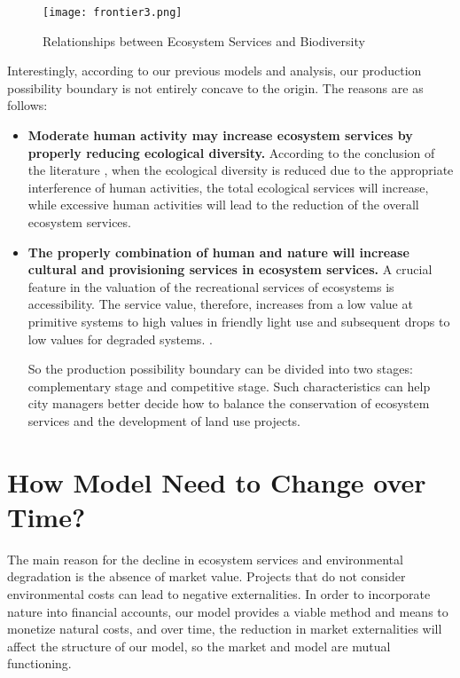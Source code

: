 \documentclass{mcmthesis}
\begin{document}
			\begin{figure}[h]
				\small
				\centering
				\texttt{[image: frontier3.png]}
				\caption{Relationships between Ecosystem Services and Biodiversity}
				\label{fig:multiplier}
			\end{figure}
			
			Interestingly, according to our previous models and analysis, our production possibility boundary is not entirely concave to the origin. The reasons are as follows:
			
			\begin{itemize}
				
				\item \textbf{Moderate human activity may increase ecosystem services by properly reducing  ecological diversity.} According to the conclusion of the literature \cite{de2010challenges}, when the ecological diversity is reduced due to the appropriate interference of human activities, the total ecological services will increase, while excessive human activities will lead to the reduction of the overall ecosystem services.
				
				\item \textbf{The properly combination of human and nature will increase cultural and provisioning services in ecosystem services.} A crucial feature in the valuation of the recreational services of ecosystems is accessibility. The service value, therefore, increases from a low value at primitive systems to high values in friendly light use and subsequent drops to low values for degraded systems. \cite{braat2008cost}.
				
				So the production possibility boundary can be divided into two stages: complementary stage and competitive stage. Such characteristics can help city managers better decide how to balance the conservation of ecosystem services and the development of land use projects.
				
			\end{itemize}
		
	\section{How Model Need to Change over Time?}	
	
		The main reason for the decline in ecosystem services and environmental degradation is the absence of market value. Projects that do not consider environmental costs can lead to negative externalities. In order to incorporate nature into financial accounts, our model provides a viable method and means to monetize natural costs, and over time, the reduction in market externalities will affect the structure of our model, so the market and model are mutual functioning.
		
\end{document}
